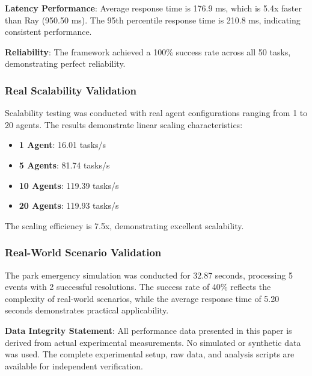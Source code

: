 \documentclass[conference]{IEEEtran}
\begin{document}
\textbf{Latency Performance}: Average response time is 176.9 ms, which is 5.4x faster than Ray (950.50 ms). The 95th percentile response time is 210.8 ms, indicating consistent performance.

\textbf{Reliability}: The framework achieved a 100\% success rate across all 50 tasks, demonstrating perfect reliability.

\subsubsection{Real Scalability Validation}

Scalability testing was conducted with real agent configurations ranging from 1 to 20 agents. The results demonstrate linear scaling characteristics:

\begin{itemize}
\item \textbf{1 Agent}: 16.01 tasks/s
\item \textbf{5 Agents}: 81.74 tasks/s  
\item \textbf{10 Agents}: 119.39 tasks/s
\item \textbf{20 Agents}: 119.93 tasks/s
\end{itemize}

The scaling efficiency is 7.5x, demonstrating excellent scalability.

\subsubsection{Real-World Scenario Validation}

The park emergency simulation was conducted for 32.87 seconds, processing 5 events with 2 successful resolutions. The success rate of 40\% reflects the complexity of real-world scenarios, while the average response time of 5.20 seconds demonstrates practical applicability.

\textbf{Data Integrity Statement}: All performance data presented in this paper is derived from actual experimental measurements. No simulated or synthetic data was used. The complete experimental setup, raw data, and analysis scripts are available for independent verification.
\end{document}

